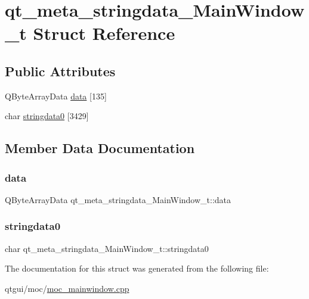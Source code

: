 \hypertarget{structqt__meta__stringdata___main_window__t}{}\section{qt\+\_\+meta\+\_\+stringdata\+\_\+\+Main\+Window\+\_\+t Struct Reference}
\label{structqt__meta__stringdata___main_window__t}
\subsection*{Public Attributes}
\begin{DoxyCompactItemize}
\item 
Q\+Byte\+Array\+Data \mbox{\hyperlink{structqt__meta__stringdata___main_window__t_abfa8076348d00d32c5a77db2e365d87a}{data}} \mbox{[}135\mbox{]}
\item 
char \mbox{\hyperlink{structqt__meta__stringdata___main_window__t_a9f60cf31019cdbff308a2d4020398ab8}{stringdata0}} \mbox{[}3429\mbox{]}
\end{DoxyCompactItemize}


\subsection{Member Data Documentation}
\mbox{\label{structqt__meta__stringdata___main_window__t_abfa8076348d00d32c5a77db2e365d87a}} 
\subsubsection{\texorpdfstring{data}{data}}
{\footnotesize\ttfamily Q\+Byte\+Array\+Data qt\+\_\+meta\+\_\+stringdata\+\_\+\+Main\+Window\+\_\+t\+::data}

\mbox{\label{structqt__meta__stringdata___main_window__t_a9f60cf31019cdbff308a2d4020398ab8}} 
\subsubsection{\texorpdfstring{stringdata0}{stringdata0}}
{\footnotesize\ttfamily char qt\+\_\+meta\+\_\+stringdata\+\_\+\+Main\+Window\+\_\+t\+::stringdata0}



The documentation for this struct was generated from the following file\+:\begin{DoxyCompactItemize}
\item 
qtgui/moc/\mbox{\hyperlink{qtgui_2moc_2moc__mainwindow_8cpp}{moc\+\_\+mainwindow.\+cpp}}\end{DoxyCompactItemize}
